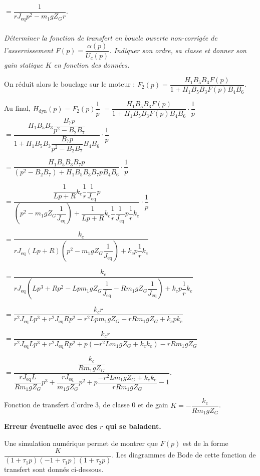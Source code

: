 \begin{multicols}{2}
\begin{corrige}
    $=\dfrac{1}{r J_{\text{eq}}p^2-m_1gZ_Gr}$.


\end{corrige}
\else
\fi


\subparagraph{} \textit{Déterminer la fonction de transfert en boucle ouverte non-corrigée de l'asservissement $ F(p)= \dfrac{\alpha (p)}{U_c (p)}$.
Indiquer son ordre, sa classe et donner son gain statique $K$ en fonction des données.}
\ifprof
\begin{corrige}

On réduit alors le bouclage sur le moteur : $F_2(p)=\dfrac{H_1B_5B_3 F(p)}{1+H_1B_5B_3 F(p)B_4 B_6}$. 

Au final, $H_{\text{dyn}}(p) = F_2 (p)\dfrac{1}{p}$ $=\dfrac{H_1B_5B_3 F(p)}{1+H_1B_5B_3 F(p)B_4 B_6} \cdot\dfrac{1}{p}$ $=\dfrac{H_1B_5B_3 \dfrac{B_7 p}{p^2-B_2B_7}}{1+H_1B_5B_3 \dfrac{B_7 p}{p^2-B_2B_7}B_4 B_6} \cdot\dfrac{1}{p}$

$=\dfrac{H_1B_5B_3 B_7 p}{\left(p^2-B_2B_7 \right)+H_1B_5B_3 B_7 pB_4 B_6} \cdot\dfrac{1}{p}$

$=\dfrac{\dfrac{1}{Lp + R}k_c\dfrac{1}{r} \dfrac{1}{J_{\text{eq}}} p}{\left(p^2-m_1gZ_G\dfrac{1}{J_{\text{eq}}} \right)+\dfrac{1}{Lp + R}k_c\dfrac{1}{r} \dfrac{1}{J_{\text{eq}}} p\dfrac{1}{r} k_e} \cdot\dfrac{1}{p}$

$=\dfrac{k_c }{ r J_{\text{eq}} \left(Lp + R\right) \left(p^2-m_1gZ_G\dfrac{1}{J_{\text{eq}}} \right)+k_c p\dfrac{1}{r} k_e} $


$=\dfrac{k_c }{ r J_{\text{eq}}  \left(Lp^3 + Rp^2-Lpm_1gZ_G\dfrac{1}{J_{\text{eq}}} - Rm_1gZ_G\dfrac{1}{J_{\text{eq}}} \right)+k_c p\dfrac{1}{r} k_e} $

$=\dfrac{k_c r}{   r^2 J_{\text{eq}}Lp^3 + r^2 J_{\text{eq}}Rp^2-r^2 Lpm_1gZ_G -r  Rm_1gZ_G +k_c p k_e} $

$=\dfrac{k_c r}{   r^2 J_{\text{eq}}Lp^3 + r^2 J_{\text{eq}}Rp^2+p\left(-r^2 Lm_1gZ_G  +k_c  k_e\right)-r  Rm_1gZ_G} $

$=\dfrac{\dfrac{k_c }{ Rm_1gZ_G}}{   \dfrac{r J_{\text{eq}}L}{ Rm_1gZ_G}p^3 + \dfrac{r J_{\text{eq}}}{  m_1gZ_G}p^2+p\dfrac{-r^2 Lm_1gZ_G  +k_c  k_e}{r  Rm_1gZ_G}-1} $.

Fonction de transfert d'ordre 3, de classe 0 et de gain $K=-\dfrac{k_c }{ Rm_1gZ_G}$.

\textbf{Erreur éventuelle avec des $r$ qui se baladent.}
\end{corrige}
\else
\fi

Une simulation numérique permet de montrer que $F(p)$ est de la forme $\dfrac{K}{(1+ \tau_1p)(-1+ \tau_1p)(1+ \tau_2p)}$. Les diagrammes de Bode de cette fonction de transfert sont donnés ci-dessous.


\end{multicols}
